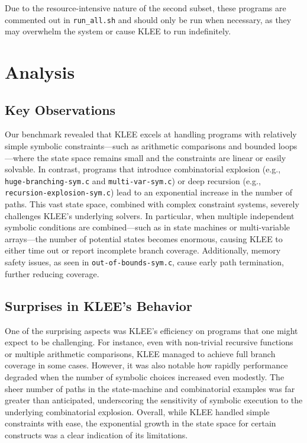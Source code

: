 \documentclass[conference]{IEEEtran}
\begin{document}
Due to the resource-intensive nature of the second subset, these programs are commented out in \texttt{run\_all.sh} and should only be run when necessary, as they may overwhelm the system or cause KLEE to run indefinitely.

\section{Analysis}

\subsection{Key Observations}
Our benchmark revealed that KLEE excels at handling programs with relatively simple symbolic constraints—such as arithmetic comparisons and bounded loops—where the state space remains small and the constraints are linear or easily solvable. In contrast, programs that introduce combinatorial explosion (e.g., \texttt{huge-branching-sym.c} and \texttt{multi-var-sym.c}) or deep recursion (e.g., \texttt{recursion-explosion-sym.c}) lead to an exponential increase in the number of paths. This vast state space, combined with complex constraint systems, severely challenges KLEE’s underlying solvers. In particular, when multiple independent symbolic conditions are combined—such as in state machines or multi-variable arrays—the number of potential states becomes enormous, causing KLEE to either time out or report incomplete branch coverage. Additionally, memory safety issues, as seen in \texttt{out-of-bounds-sym.c}, cause early path termination, further reducing coverage.

\subsection{Surprises in KLEE’s Behavior}
One of the surprising aspects was KLEE’s efficiency on programs that one might expect to be challenging. For instance, even with non-trivial recursive functions or multiple arithmetic comparisons, KLEE managed to achieve full branch coverage in some cases. However, it was also notable how rapidly performance degraded when the number of symbolic choices increased even modestly. The sheer number of paths in the state-machine and combinatorial examples was far greater than anticipated, underscoring the sensitivity of symbolic execution to the underlying combinatorial explosion. Overall, while KLEE handled simple constraints with ease, the exponential growth in the state space for certain constructs was a clear indication of its limitations.
\end{document}

